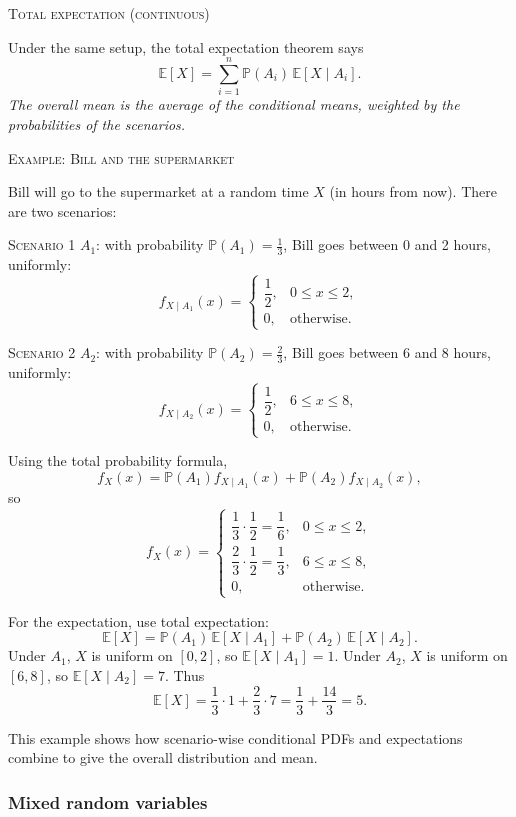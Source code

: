 \bigskip\textsc{Total expectation (continuous)}

Under the same setup, the total expectation theorem says
\[
\mathbb{E}[X]
=
\sum_{i=1}^n \mathbb{P}(A_i)\,\mathbb{E}[X \mid A_i].
\]
\textit{The overall mean is the average of the conditional means, weighted by the probabilities of the scenarios.}

\bigskip\textsc{Example: Bill and the supermarket}

Bill will go to the supermarket at a random time \(X\) (in hours from now).  
There are two scenarios:

\textsc{Scenario 1} \(A_1\): with probability \(\mathbb{P}(A_1)=\tfrac{1}{3}\), Bill goes between 0 and 2 hours, uniformly:
\[
f_{X\mid A_1}(x) =
\begin{cases}
\dfrac{1}{2}, & 0 \le x \le 2,\\
0, & \text{otherwise}.
\end{cases}
\]

\textsc{Scenario 2} \(A_2\): with probability \(\mathbb{P}(A_2)=\tfrac{2}{3}\), Bill goes between 6 and 8 hours, uniformly:
\[
f_{X\mid A_2}(x) =
\begin{cases}
\dfrac{1}{2}, & 6 \le x \le 8,\\
0, & \text{otherwise}.
\end{cases}
\]

Using the total probability formula,
\[
f_X(x)
=
\mathbb{P}(A_1)f_{X\mid A_1}(x)
+
\mathbb{P}(A_2)f_{X\mid A_2}(x),
\]
so
\[
f_X(x)
=
\begin{cases}
\dfrac{1}{3}\cdot \dfrac{1}{2} = \dfrac{1}{6}, & 0 \le x \le 2,\\[4pt]
\dfrac{2}{3}\cdot \dfrac{1}{2} = \dfrac{1}{3}, & 6 \le x \le 8,\\[4pt]
0, & \text{otherwise}.
\end{cases}
\]

For the expectation, use total expectation:
\[
\mathbb{E}[X]
=
\mathbb{P}(A_1)\,\mathbb{E}[X\mid A_1]
+
\mathbb{P}(A_2)\,\mathbb{E}[X\mid A_2].
\]
Under \(A_1\), \(X\) is uniform on \([0,2]\), so \(\mathbb{E}[X\mid A_1]=1\).  
Under \(A_2\), \(X\) is uniform on \([6,8]\), so \(\mathbb{E}[X\mid A_2]=7\).  
Thus
\[
\mathbb{E}[X]
=
\frac{1}{3}\cdot 1 + \frac{2}{3}\cdot 7
=
\frac{1}{3} + \frac{14}{3}
=
5.
\]

This example shows how scenario-wise conditional PDFs and expectations combine to give the overall distribution and mean.


\subsubsection{Mixed random variables}

